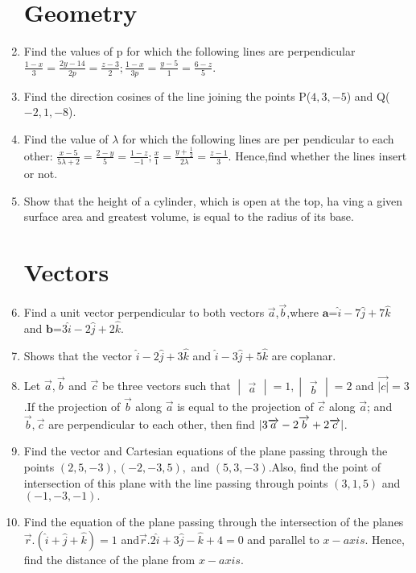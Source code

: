 \documentclass[12pt,-letter paper]{article}
\DeclarePairedDelimiter\abs{\lvert}{\rvert}
\providecommand{\brak}[1]{\ensuremath{\left(#1\right)}}
\theoremstyle{remark}
\newcommand{\mydet}[1]{\ensuremath{\begin{vmatrix}#1\end{vmatrix}}}
\let\vec\mathbf
\begin{document}
\begin{enumerate}
		\section{Geometry}
		\item Find the values of p for which the following lines are perpendicular
  $\frac{1-x}{3}=\frac{2y-14}{2p}=\frac{z-3}{2};\frac{1-x}{3p}=\frac{y-5}{1}=\frac{6-z}{5}$.
  \item Find the direction cosines of the line joining  the points P($4,3,-5$) and Q($-2,1,-8$).
   \item Find the value of $\lambda$ for which the following lines are per    pendicular to each other: $\frac{x-5}{5\lambda+2}= \frac{2-y}{5} = \frac{1-z}{-1}; \frac{x}{1}=\frac{y+\frac{1}{2}}{2\lambda}=\frac{z-1}{3}$. Hence,find whether the lines insert or not.
	  \item  Show that the height of a cylinder, which is open at the top, ha    ving a given surface area and greatest volume, is equal to the radius of its base.
	  \section{Vectors}
  \item Find a unit vector perpendicular to both vectors $\overrightarrow{a}$,$\overrightarrow{b}$,where $\vec{a}$=$\hat{i}-7\hat{j}+7\hat{k}$ and $\vec{b}$=$3\hat{i}-2\hat{j}+2\hat{k}$.
  \item Shows that the vector $\hat{i}-2\hat{j}+3\hat{k}$ and $\hat{i}-3\hat{j}+5\hat{k}$ are coplanar.
	  \item Let  $ \overrightarrow a ,\overrightarrow b$ and $\overrightarrow c $ be three vectors such that $\mydet{\overrightarrow{a}}  = 1 ,\mydet{\overrightarrow{b}}= 2$ and $\overrightarrow{|c|} =3$ .If the projection of $\overrightarrow b $ along $\overrightarrow a $ is equal to the projection of $\overrightarrow c $ along $ \overrightarrow a $; and $\overrightarrow b,\overrightarrow c $ are perpendicular to each other, then find $\abs{3\overrightarrow a-2\overrightarrow b +2\overrightarrow c}$.
		  \item Find the vector and Cartesian equations of the plane passing through the points $\brak{2,5,-3},\brak{-2,-3,5},$ and $\brak{5,3,-3}$.Also, find the point of intersection of this plane with the line passing through points $\brak{3,1,5} $ and $\brak{-1,-3,-1}.$
			  \item Find the equation of the plane passing through the intersection of the planes $\overrightarrow r.\brak{\hat{i}+\hat{j}+\hat{k}}=1 $ and$\overrightarrow  r .2\hat{i}+3\hat{j}-\hat{k}+4=0 $ and parallel to $x-axis$. Hence, find the distance of the plane from $x-axis$.

\end{enumerate}
\end{document}
